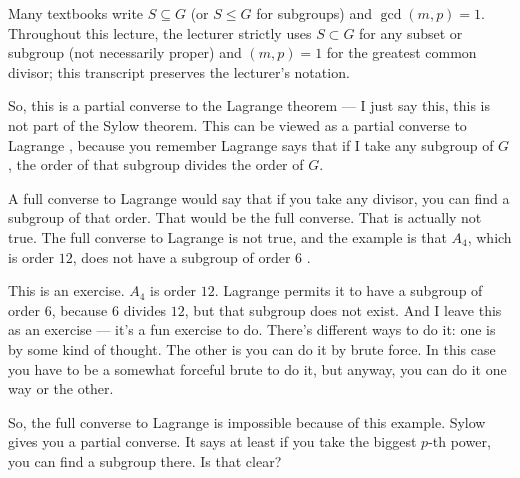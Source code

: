 \begin{aiNote}[Notation Conventions: \texorpdfstring{$\subset$}{subset} and \texorpdfstring{$(m, p) = 1$}{(m, p) = 1}]
Many textbooks write $S \subseteq G$ (or $S \le G$ for subgroups) and $\gcd(m, p) = 1$. Throughout this lecture, the lecturer strictly uses $S \subset G$ for any subset or subgroup (not necessarily proper) and $(m, p) = 1$ for the greatest common divisor; this transcript preserves the lecturer's notation.
\end{aiNote}

\begin{speech}[00:01:22 - 00:02:58]
So, this is a partial converse to the Lagrange theorem --- I just say this, this is not part of the Sylow theorem. This can be viewed as a partial converse to Lagrange , because you remember Lagrange says that if I take any subgroup of $G$, the order of that subgroup divides the order of $G$.

A full converse to Lagrange would say that if you take any divisor, you can find a subgroup of that order. That would be the full converse. That is actually not true. The full converse to Lagrange is not true, and the example is that $A_4$, which is order $12$, does not have a subgroup of order $6$ .

This is an exercise. $A_4$ is order $12$. Lagrange permits it to have a subgroup of order $6$, because $6$ divides $12$, but that subgroup does not exist. And I leave this as an exercise --- it's a fun exercise to do. There's different ways to do it: one is by some kind of thought. The other is you can do it by brute force. In this case you have to be a somewhat forceful brute to do it, but anyway, you can do it one way or the other.

So, the full converse to Lagrange is impossible because of this example. Sylow gives you a partial converse. It says at least if you take the biggest $p$-th power, you can find a subgroup there. Is that clear?
\end{speech}

